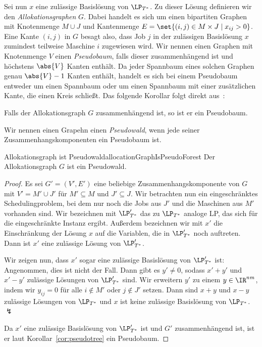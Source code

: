 \documentclass[language=ngerman,algolist]{TemplateLecture}
\begin{document}
Sei nun $x$ eine zulässige Basislösung von $\LP_{T^*}$. Zu dieser Lösung definieren wir den \emph{Allokationsgraphen} $G$. Dabei handelt es sich um einen bipartiten Graphen mit Knotenmenge $M \cup J$ und Kantenmenge $E = \set{(i,j) \in M \times J \mid x_{ij} > 0}$. Eine Kante $(i,j)$ in $G$ besagt also, dass Job $j$ in der zulässigen Basislösung $x$ zumindest teilweise Maschine $i$ zugewiesen wird. Wir nennen einen Graphen mit Knotenmenge $V$ einen \emph{Pseudobaum}, falls dieser zusammenhängend ist und höchstens $\abs{V}$ Kanten enthält. Da jeder Spannbaum eines solchen Graphen genau $\abs{V} - 1$ Kanten enthält, handelt es sich bei einem Pseudobaum entweder um einen Spannbaum oder um einen Spannbaum mit einer zusätzlichen Kante, die einen Kreis schließt. Das folgende Korollar folgt direkt aus~:

\begin{cor}\label{cor:pseudotree}
    Falls der Allokationsgraph $G$ zusammenhängend ist, so ist er ein Pseudobaum.
\end{cor}

Wir nennen einen Grapehn einen \emph{Pseudowald}, wenn jede seiner Zusammenhangskomponenten ein Pseudobaum ist.

\begin{lem}{Allokationsgraph ist Pseudowald}{allocationGraphIsPseudoForest}
    Der Allokationsgraph $G$ ist ein Pseudowald.
\end{lem}

\begin{proof}
    Es sei $G' = (V', E')$ eine beliebige Zusammenhangskomponente von $G$ mit $V' = M' \cup J'$ für $M' \subseteq M$ und $J' \subseteq J$. Wir betrachten nun ein eingeschränktes Schedulingproblem, bei dem nur noch die Jobs aus $J'$ und die Maschinen aus $M'$ vorhanden sind. Wir bezeichnen mit $\LP_{T^*}'$ das zu $\LP_{T^*}$ analoge LP, das sich für die eingeschränkte Instanz ergibt. Außerdem bezeichnen wir mit $x'$ die Einschränkung der Lösung $x$ auf die Variablen, die in $\LP_{T^*}'$ noch auftreten. Dann ist $x'$ eine zulässige Lösung von $\LP_{T^*}'$.

    Wir zeigen nun, dass $x'$ sogar eine zulässige Basislösung von $\LP_{T^*}'$ ist: Angenommen, dies ist nicht der Fall. Dann gibt es $y' \neq 0$, sodass $x'+y'$ und $x'-y'$ zulässige Lösungen von $\LP_{T^*}'$ sind. Wir erweitern $y'$ zu einem $y \in \IR^{nm}$, indem wir $y_{ij} = 0$ für alle $i \notin M'$ oder $j \notin J'$ setzen. Dann sind $x + y$ und $x - y$ zulässige Lösungen von $\LP_{T^*}$ und $x$ ist keine zulässige Basislösung von $\LP_{T^*}$. $\lightning$

    Da $x'$ eine zulässige Basislösung von $\LP_{T^*}'$ ist und $G'$ zusammenhängend ist, ist er laut Korollar~\ref{cor:pseudotree} ein Pseudobaum.
\end{proof}
\end{document}
